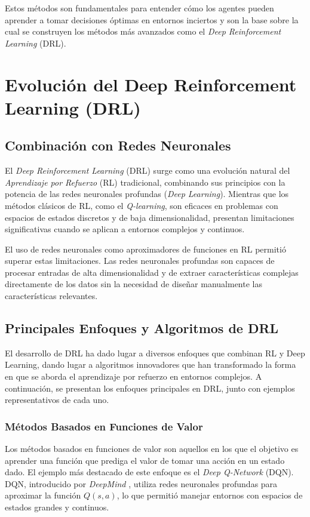 \documentclass[a4paper,12pt, twoside]{report}
\begin{document}
Estos métodos son fundamentales para entender cómo los agentes pueden aprender a tomar decisiones 
óptimas en entornos inciertos y son la base sobre la cual se construyen los métodos más avanzados 
como el \textit{Deep Reinforcement Learning} (DRL).


\section{Evolución del Deep Reinforcement Learning (DRL)}

\subsection{Combinación con Redes Neuronales}

El \textit{Deep Reinforcement Learning} (DRL) surge como una evolución natural del 
\textit{Aprendizaje por Refuerzo} (RL) tradicional, combinando sus principios con la potencia 
de las redes neuronales profundas (\textit{Deep Learning}). Mientras que los métodos clásicos 
de RL, como el \textit{Q-learning}, son eficaces en problemas con espacios de estados discretos 
y de baja dimensionalidad, presentan limitaciones significativas cuando se aplican a entornos 
complejos y continuos.

El uso de redes neuronales como aproximadores de funciones en RL permitió superar estas 
limitaciones. Las redes neuronales profundas son capaces de procesar entradas de alta 
dimensionalidad y de extraer características complejas directamente de los datos sin la necesidad 
de diseñar manualmente las características relevantes. 

\subsection{Principales Enfoques y Algoritmos de DRL}

El desarrollo de DRL ha dado lugar a diversos enfoques que combinan RL y Deep Learning, dando 
lugar a algoritmos innovadores que han transformado la forma en que se aborda el aprendizaje 
por refuerzo en entornos complejos. A continuación, se presentan los enfoques principales en 
DRL, junto con ejemplos representativos de cada uno.

\subsubsection{Métodos Basados en Funciones de Valor}

Los métodos basados en funciones de valor son aquellos en los que el objetivo es aprender 
una función que prediga el valor de tomar una acción en un estado dado. El ejemplo más 
destacado de este enfoque es el \textit{Deep Q-Network} (DQN). DQN, introducido por 
\textit{DeepMind} \cite{deepmind_drl}, utiliza redes neuronales profundas para aproximar la función \(Q(s, a)\), 
lo que permitió manejar entornos con espacios de estados grandes y continuos.
\end{document}
